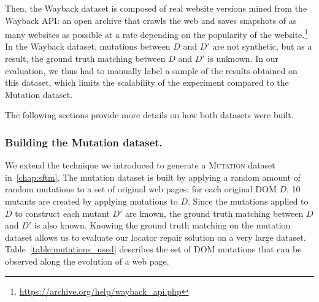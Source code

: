 Then, the {\sc Wayback} dataset is composed of real website versions mined from the Wayback API: an open archive that crawls the web and saves snapshots of as many websites as possible at a rate depending on the popularity of the website.\footnote{\url{https://archive.org/help/wayback_api.php}}
In the {\sc Wayback} dataset, mutations between $D$ and $D'$ are not synthetic, but as a result, the ground truth matching between $D$ and $D'$ is unknown.
In our evaluation, we thus had to manually label a sample of the results obtained on this dataset, which limits the scalability of the experiment compared to the {\sc Mutation} dataset. 

The following sections provide more details on how both datasets were built.

\subsubsection{Building the {\sc Mutation} dataset.}\label{mutationDataset}
We extend the technique we introduced to generate a \textsc{Mutation} dataset in~\ref{chap:sftm}.
The mutation dataset is built by applying a random amount of random mutations to a set of original web pages: for each original DOM $D$, 10 mutants are created by applying mutations to $D$.
Since the mutations applied to $D$ to construct each mutant $D'$ are known, the ground truth matching between $D$ and $D'$ is also known.
Knowing the ground truth matching on the mutation dataset allows us to evaluate our locator repair solution on a very large dataset. 
% 
Table~\ref{table:mutations_used} describes the set of DOM mutations that can be observed along the evolution of a web page.

\begin{table}
    \caption{Mutations applied in the \textsc{Mutation} dataset~\ref{chap:sftm}.}
    \label{table:mutations_used}
    \centering
\end{table}

